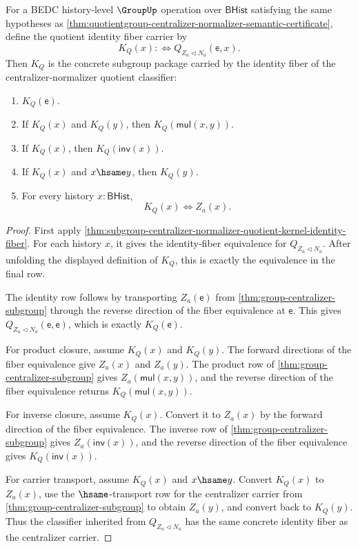 \begin{theorem}
\label{thm:quotientgroup-centralizer-normalizer-identity-fiber-subgroup}
For a BEDC history-level $\GroupUp$ operation over $\mathsf{BHist}$ satisfying
the same hypotheses as
\autoref{thm:quotientgroup-centralizer-normalizer-semantic-certificate}, define
the quotient identity fiber carrier by
$$
K_Q(x) :\Longleftrightarrow Q_{Z_a\triangleleft N_a}(\mathsf{e},x).
$$
Then $K_Q$ is the concrete subgroup package carried by the identity fiber of
the centralizer-normalizer quotient classifier:
\begin{enumerate}
\item $K_Q(\mathsf{e})$.
\item If $K_Q(x)$ and $K_Q(y)$, then $K_Q(\mathsf{mul}(x,y))$.
\item If $K_Q(x)$, then $K_Q(\mathsf{inv}(x))$.
\item If $K_Q(x)$ and $x\hsame y$, then $K_Q(y)$.
\item For every history $x:\mathsf{BHist}$,
$$
K_Q(x)\Longleftrightarrow Z_a(x).
$$
\end{enumerate}
\end{theorem}
\begin{proof}
First apply
\autoref{thm:subgroup-centralizer-normalizer-quotient-kernel-identity-fiber}.
For each history $x$, it gives the identity-fiber equivalence for
$Q_{Z_a\triangleleft N_a}$. After unfolding the displayed definition of $K_Q$,
this is exactly the equivalence in the final row.

The identity row follows by transporting $Z_a(\mathsf{e})$ from
\autoref{thm:group-centralizer-subgroup} through the reverse direction of the
fiber equivalence at $\mathsf{e}$. This gives
$Q_{Z_a\triangleleft N_a}(\mathsf{e},\mathsf{e})$, which is exactly
$K_Q(\mathsf{e})$.

For product closure, assume $K_Q(x)$ and $K_Q(y)$. The forward directions of
the fiber equivalence give $Z_a(x)$ and $Z_a(y)$. The product row of
\autoref{thm:group-centralizer-subgroup} gives
$Z_a(\mathsf{mul}(x,y))$, and the reverse direction of the fiber equivalence
returns $K_Q(\mathsf{mul}(x,y))$.

For inverse closure, assume $K_Q(x)$. Convert it to $Z_a(x)$ by the forward
direction of the fiber equivalence. The inverse row of
\autoref{thm:group-centralizer-subgroup} gives $Z_a(\mathsf{inv}(x))$, and the
reverse direction of the fiber equivalence gives $K_Q(\mathsf{inv}(x))$.

For carrier transport, assume $K_Q(x)$ and $x\hsame y$. Convert $K_Q(x)$ to
$Z_a(x)$, use the $\hsame$-transport row for the centralizer carrier from
\autoref{thm:group-centralizer-subgroup} to obtain $Z_a(y)$, and convert back
to $K_Q(y)$. Thus the classifier inherited from
$Q_{Z_a\triangleleft N_a}$ has the same concrete identity fiber as the
centralizer carrier.
\end{proof}

